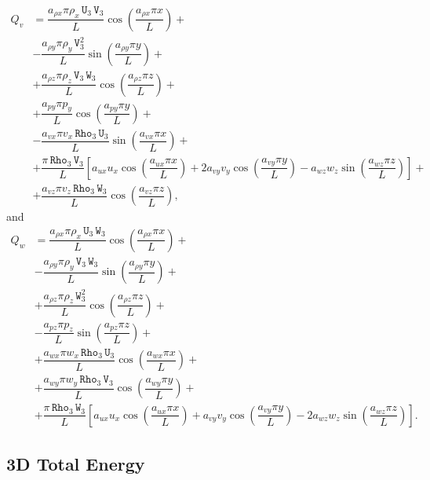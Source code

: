 \documentclass[10pt]{article}
\newcommand{\Rho}{\,\mathtt{Rho}}
\newcommand{\U}{\,\mathtt{U}}
\newcommand{\V}{\,\mathtt{V}}
\newcommand{\W}{\,\mathtt{W}}
\begin{document}
\begin{equation}
 \begin{split}
Q_v &= \dfrac{a_{\rho x} \pi \rho_x \U_3 \V_3 }{L}\cos\left(\dfrac{a_{\rho x} \pi x}{L}\right)+\\
&-\dfrac{a_{\rho y} \pi \rho_y \V_3^2 }{L}\sin\left(\dfrac{a_{\rho y} \pi y}{L}\right)+\\
&+\dfrac{a_{\rho z} \pi \rho_z \V_3 \W_3 }{L}\cos\left(\dfrac{a_{\rho z}\pi z }{L}\right)+\\
&+\dfrac{a_{py} \pi p_y }{L}\cos\left(\dfrac{a_{py} \pi y}{L}\right)+\\
&-\dfrac{a_{vx} \pi v_x \Rho_3 \U_3 }{L}\sin\left(\dfrac{a_{vx} \pi x}{L}\right)+\\
&+\dfrac{\pi \Rho_3 \V_3}{L}\left[a_{ux} u_x \cos\left(\dfrac{a_{ux} \pi x}{L}\right)+2 a_{vy} v_y \cos\left(\dfrac{a_{vy} \pi y}{L}\right)-a_{wz} w_z \sin\left(\dfrac{a_{wz}\pi z }{L}\right)\right]+\\
&+\dfrac{a_{vz} \pi v_z \Rho_3 \W_3 }{L}\cos\left(\dfrac{a_{vz}\pi z }{L}\right),
 \end{split}
\end{equation}
and
\begin{equation}
 \begin{split}
Q_w &= \dfrac{a_{\rho x} \pi \rho_x \U_3 \W_3}{L} \cos\left(\dfrac{a_{\rho x} \pi x}{L}\right)+\\
&-\dfrac{a_{\rho y} \pi \rho_y \V_3 \W_3 }{L}\sin\left(\dfrac{a_{\rho y} \pi y}{L}\right)+\\
&+\dfrac{a_{\rho z} \pi \rho_z \W_3^2 }{L}\cos\left(\dfrac{a_{\rho z}\pi z }{L}\right)+\\
&-\dfrac{a_{pz} \pi p_z }{L}\sin\left(\dfrac{a_{pz}\pi z }{L}\right)+\\
&+\dfrac{a_{wx} \pi w_x \Rho_3 \U_3 }{L}\cos\left(\dfrac{a_{wx} \pi x}{L}\right)+\\
&+\dfrac{a_{wy} \pi w_y \Rho_3 \V_3}{L}\cos\left(\dfrac{a_{wy} \pi y}{L}\right) +\\
&+\dfrac{\pi \Rho_3 \W_3}{L}\left[a_{ux} u_x \cos\left(\dfrac{a_{ux} \pi x}{L}\right)+a_{vy} v_y \cos\left(\dfrac{a_{vy} \pi y}{L}\right)-2 a_{wz} w_z \sin\left(\dfrac{a_{wz}\pi z }{L}\right)\right].
 \end{split}
\end{equation}

\subsection{3D Total Energy}
\end{document}
